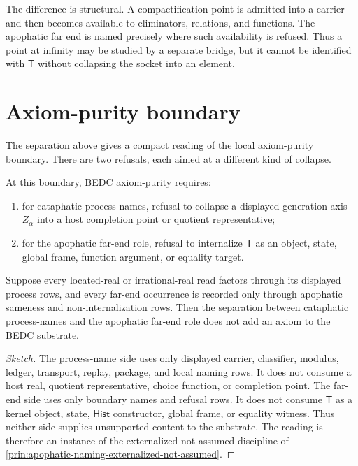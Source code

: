 The difference is structural. A compactification point is admitted into a
carrier and then becomes available to eliminators, relations, and functions.
The apophatic far end is named precisely where such availability is refused.
Thus a point at infinity may be studied by a separate bridge, but it cannot be
identified with $\mathsf{T}$ without collapsing the socket into an element.

\section{Axiom-purity boundary}
\label{sec:cataphatic-process-axiom-purity-boundary}

The separation above gives a compact reading of the local axiom-purity
boundary. There are two refusals, each aimed at a different kind of collapse.

\begin{principle}
\label{prin:two-refusals-process-far-end-boundary}
At this boundary, BEDC axiom-purity requires:
\begin{enumerate}
\item for cataphatic process-names, refusal to collapse a displayed
generation axis $Z_\alpha$ into a host completion point or quotient
representative;
\item for the apophatic far-end role, refusal to internalize $\mathsf{T}$ as
an object, state, global frame, function argument, or equality target.
\end{enumerate}
\end{principle}

\begin{theorem}
\label{thm:process-far-end-separation-preserves-axiom-purity}
Suppose every located-real or irrational-real read factors through its
displayed process rows, and every far-end occurrence is recorded only through
apophatic sameness and non-internalization rows. Then the separation between
cataphatic process-names and the apophatic far-end role does not add an axiom
to the BEDC substrate.
\end{theorem}

\begin{proof}[Sketch]
The process-name side uses only displayed carrier, classifier, modulus,
ledger, transport, replay, package, and local naming rows. It does not
consume a host real, quotient representative, choice function, or completion
point. The far-end side uses only boundary names and refusal rows. It does not
consume $\mathsf{T}$ as a kernel object, state, $\mathsf{Hist}$ constructor,
global frame, or equality witness. Thus neither side supplies unsupported
content to the substrate. The reading is therefore an instance of the
externalized-not-assumed discipline of
\autoref{prin:apophatic-naming-externalized-not-assumed}.
\end{proof}

